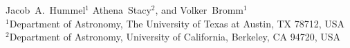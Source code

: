 Jacob~A.~Hummel$^{1}$ Athena~Stacy$^{2}$, and Volker~Bromm$^{1}$\\
$^1$Department of Astronomy, The University of Texas at Austin, TX 78712, USA\\
$^2$Department of Astronomy, University of California, Berkeley, CA 94720, USA